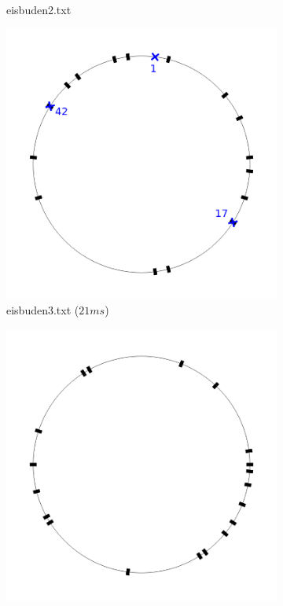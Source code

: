\documentclass[a4paper,10pt,ngerman,captions=figureheading]{scrartcl}
\newcommand{\imageWidth}{0.3\linewidth}
\begin{document}
\begin{figure}[h!t]
\begin{subfigure}[t]{\imageWidth}
        \caption{eisbuden2.txt}
        \label{fig:eisbuden2}
    \end{subfigure}
    \begin{subfigure}[t]{\imageWidth}
        \includegraphics[width=\linewidth]{eisbuden3.png}
        \caption{eisbuden3.txt ($21ms$)}
        \label{fig:eisbuden3}
    \end{subfigure}
    \begin{subfigure}[t]{\imageWidth}
        \includegraphics[width=\linewidth]{eisbuden4.png}

\end{subfigure}
\end{figure}
\end{document}
